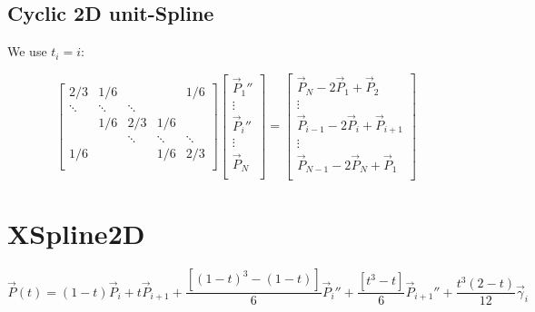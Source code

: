 \documentclass[aps,12pt]{revtex4}
\begin{document}
\subsection{Cyclic 2D unit-Spline}

We use $t_i=i$:

\begin{equation}
\begin{bmatrix}
2/3 & 1/6 &   &   & 1/6 \\
\ddots & \ddots & \ddots &   &   \\
  & 1/6 & 2/3 & 1/6 &  \\
  &   & \ddots & \ddots & \ddots\\
1/6 &   &   & 1/6 & 2/3\\
\end{bmatrix}
\begin{bmatrix}
\vec{P}_1''\\
\vdots\\
\vec{P}_i''\\
\vdots\\
\vec{P}_N\\
\end{bmatrix}
=
\begin{bmatrix}
\vec{P}_N - 2\vec{P}_1 + \vec{P}_2\\
\vdots \\
\vec{P}_{i-1} - 2\vec{P}_i + \vec{P}_{i+1} \\
\vdots\\
\vec{P}_{N-1} - 2\vec{P}_N + \vec{P}_1\\
\end{bmatrix}
\end{equation}

\section{XSpline2D}

\begin{equation}
	\vec{P}(t) = (1-t)\vec{P}_i + t \vec{P}_{i+1} 
	+  \dfrac{\left[(1-t)^3 - (1-t) \right]}{6} \vec{P}_i'' + \dfrac{\left[t^3-t\right]}{6} \vec{P}_{i+1}'' + \dfrac{t^3(2-t)}{12} \vec{\gamma}_i
\end{equation}
\end{document}
